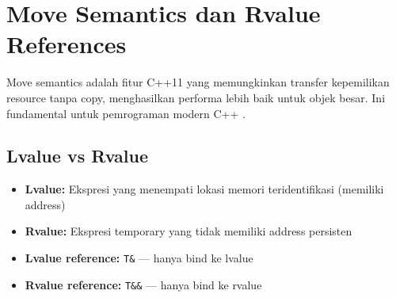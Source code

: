 \documentclass[../main.tex]{subfiles}
\begin{document}
\section{Move Semantics dan Rvalue References}
Move semantics adalah fitur C++11 yang memungkinkan transfer kepemilikan resource tanpa copy, menghasilkan performa lebih baik untuk objek besar. Ini fundamental untuk pemrograman modern C++ \parencite{cpp-reference}.

\subsection{Lvalue vs Rvalue}
\begin{itemize}
  \item \textbf{Lvalue:} Ekspresi yang menempati lokasi memori teridentifikasi (memiliki address)
  \item \textbf{Rvalue:} Ekspresi temporary yang tidak memiliki address persisten
  \item \textbf{Lvalue reference:} \texttt{T\&} --- hanya bind ke lvalue
  \item \textbf{Rvalue reference:} \texttt{T\&\&} --- hanya bind ke rvalue
\end{itemize}
\end{document}
